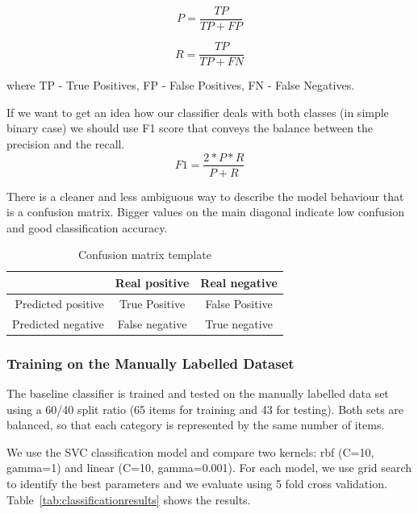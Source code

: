 \documentclass[11pt]{article}
\begin{document}
\begin{equation}
P = \frac{TP}{TP+FP} 
\end{equation}

\begin{equation}
R = \frac{TP}{TP+FN}
\end{equation}

where TP - True Positives, FP - False Positives, FN - False Negatives.

If we want to get an idea how our classifier deals with both classes (in simple binary case) we should use F1 score that conveys the balance between the precision and the recall.
\begin{equation}
F1 = \frac{2*P*R}{P+R}
\end{equation}

    There is a cleaner and less ambiguous way to describe the model behaviour that is a confusion matrix. Bigger values on the main diagonal indicate low confusion and good classification accuracy. 

\begin{table}[htb]
\begin{center}
\begin{tabular}{ |r|c|c| }
\hline
& Real positive & Real negative \\ \hline
Predicted positive & True Positive 	& False Positive \\ \hline
Predicted negative & False negative & True negative \\ \hline
\end{tabular}
\caption{Confusion matrix template}
\end{center}
\end{table}
\FloatBarrier

\subsubsection{Training on the Manually Labelled Dataset}

The baseline classifier is trained and tested on the manually labelled
data set using a 60/40 split ratio (65 items for training and 43 for
testing). Both sets are balanced, so that each category is represented
by the same number of items.

We use the SVC classification model and compare two kernels: rbf
(C=10, gamma=1) and linear (C=10, gamma=0.001). For each model, we use
grid search to identify the best parameters and we evaluate using 5
fold cross validation. Table~\ref{tab:classificationresults} shows the results. 
\end{document}
